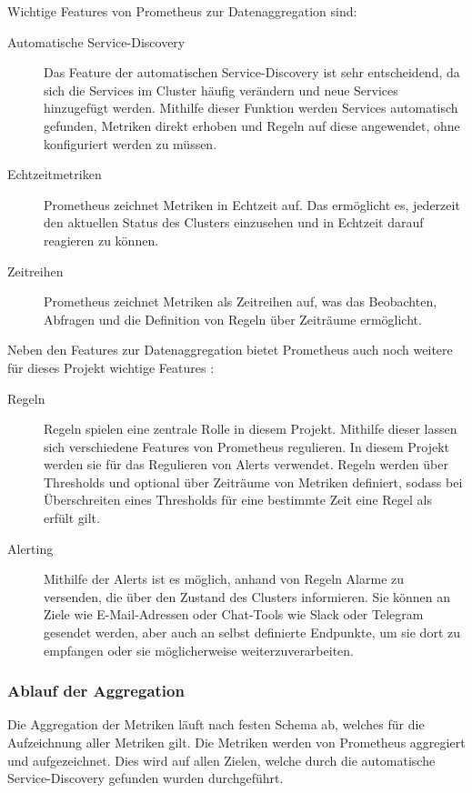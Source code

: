 \documentclass[a4paper,10pt]{scrartcl}
\begin{document}
Wichtige Features von Prometheus zur Datenaggregation sind:
\begin{description}

\item[Automatische Service-Discovery]
Das Feature der automatischen Service-Discovery ist sehr entscheidend, da sich die Services im Cluster häufig verändern und neue Services hinzugefügt werden. Mithilfe dieser Funktion werden Services automatisch gefunden, Metriken direkt erhoben und Regeln auf diese angewendet, ohne konfiguriert werden zu müssen.
\item[Echtzeitmetriken]
Prometheus zeichnet Metriken in Echtzeit auf. Das ermöglicht es, jederzeit den aktuellen Status des Clusters einzusehen und in Echtzeit darauf reagieren zu können.
\item[Zeitreihen]
Prometheus zeichnet Metriken als Zeitreihen auf, was das Beobachten, Abfragen und die Definition von Regeln über Zeiträume ermöglicht. 

\end{description}


Neben den Features zur Datenaggregation bietet Prometheus auch noch weitere für dieses Projekt wichtige Features :
\begin{description}
\item[Regeln]
Regeln spielen eine zentrale Rolle in diesem Projekt. Mithilfe dieser lassen sich verschiedene Features von Prometheus regulieren. In diesem Projekt werden sie für das Regulieren von Alerts verwendet.
Regeln werden über Thresholds und optional über Zeiträume von Metriken definiert, sodass bei Überschreiten eines Thresholds für eine bestimmte Zeit eine Regel als erfült gilt.
\item[Alerting]
Mithilfe der Alerts ist es möglich, anhand von Regeln Alarme zu versenden, die über den Zustand des Clusters informieren. Sie können an Ziele wie E-Mail-Adressen oder Chat-Tools wie Slack oder Telegram gesendet werden, aber auch  an selbst definierte Endpunkte, um sie dort zu empfangen oder sie möglicherweise weiterzuverarbeiten.

\end{description}

\subsubsection{Ablauf der Aggregation}

Die Aggregation der Metriken läuft nach festen Schema ab, welches für die Aufzeichnung aller Metriken gilt.
Die Metriken werden von Prometheus aggregiert und aufgezeichnet. Dies wird auf allen Zielen, welche durch die automatische Service-Discovery gefunden wurden durchgeführt.\\
\end{document}
